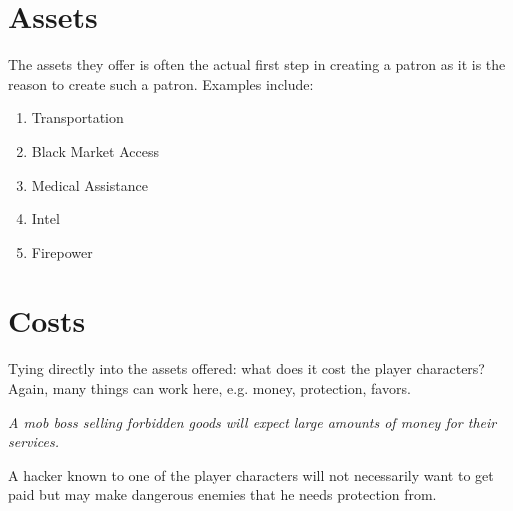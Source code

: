 \documentclass[12pt,a4paper,openany]{book}
\begin{document}
	\section*{Assets}
	The assets they offer is often the actual first step in creating a patron as it is the reason to create such a patron. Examples include:
	\begin{enumerate}
		\setlength\itemsep{-8mm} \vspace{-8mm}
		\item Transportation
		\item Black Market Access
		\item Medical Assistance
		\item Intel
		\item Firepower
	\end{enumerate}
	\section*{Costs}
	Tying directly into the assets offered: what does it cost the player characters? Again, many things can work here, e.g. money, protection, favors.
	\begin{exampleblock}
		\itshape A mob boss selling forbidden goods will expect large amounts of money for their services.\par
		A hacker known to one of the player characters will not necessarily want to get paid but may make dangerous enemies that he needs protection from.
	\end{exampleblock}
\end{document}
